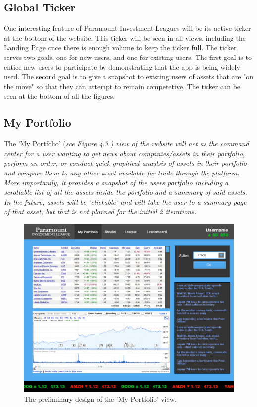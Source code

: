 \subsection{Global Ticker}

One interesting feature of Paramount Investment Leagues will be its active ticker at the
bottom of the website.  This ticker will be seen in all views, including the Landing Page
once there is enough volume to keep the ticker full.  The ticker serves two goals, one for
new users, and one for existing users.  The first goal is to entice new users to
participate by demonstrating that the app is being widely used. The second goal is to give
a snapshot to existing users of assets that are "on the move" so that they can attempt to
remain competetive. The ticker can be seen at the bottom of all the figures.\\

\subsection{My Portfolio}

The 'My Portfolio' (\em see Figure 4.3 \em) view of the  website will act as the command
center for a user wanting to get news about companies/assets in their portfolio, perform
an order, or conduct quick graphical anaylsis of assets in their portfolio and compare
them to any other asset available for trade through the platform.\\

More importantly, it provides a snapshot of the users portfolio including a scrollable list
of all the assets inside the portfolio and a summary of said assets.  In the future, assets
will be 'clickable' and will take the user to a summary page of that asset, but that is not
planned for the initial 2 iterations.\\

\begin{figure}
\centering
\includegraphics[width=5.5in]{./img/mock/portfolio.jpg}
\caption{The preliminary design of the 'My Portfolio' view.}
\end{figure}

